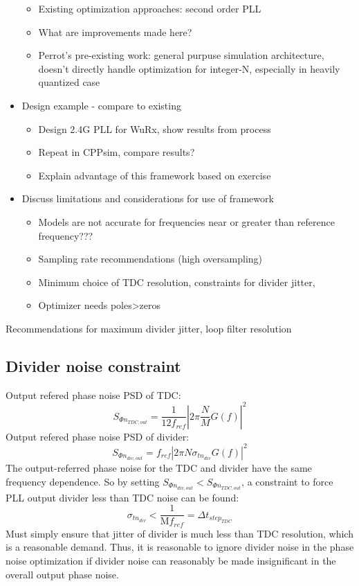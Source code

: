 \begin{itemize}
\begin{itemize}
		\item Existing optimization approaches: second order PLL \cite{spalvieri_2006}
		\item What are improvements made here?
		\item Perrot's pre-existing work: general purpuse simulation architecture, doesn't directly handle optimization for integer-N, especially in heavily quantized case
	\end{itemize}
	\item Design example - compare to existing
	\begin{itemize}
		\item Design 2.4G PLL for WuRx, show results from process
		\item Repeat in CPPsim, compare results?
		\item Explain advantage of this framework based on exercise
	\end{itemize}
	\item Discuss limitations and considerations for use of framework
	\begin{itemize}
		\item Models are not accurate for frequencies near or greater than reference frequency???
		\item Sampling rate recommendations (high oversampling)
		\item Minimum choice of TDC resolution, constraints for divider jitter,
		\item Optimizer needs poles>zeros
	\end{itemize}
\end{itemize}

	Recommendations for maximum divider jitter, loop filter resolution
	\subsection{Divider noise constraint}
		Output refered phase noise PSD of TDC:
		\begin{equation}
			S_{\Phi n_{TDC,out}} = \frac{1}{12 f_{ref}}\left|2\pi\frac{N}{M} G(f) \right|^2
		\end{equation}
		Output refered phase noise PSD of divider:
		\begin{equation}
			S_{\Phi n_{div, out}} = f_{ref} \left|2\pi N \sigma_{tn_{div}} G(f)\right|^2
		\end{equation}
		The output-referred phase noise for the TDC and divider have the same frequency dependence. So by setting $S_{\Phi n_{div, out}} < S_{\Phi n_{TDC,out}}$, a constraint to force PLL output divider less than TDC noise can be found:
		\begin{equation}
			\sigma_{tn_{div}} < \frac{1}{\mathrm{M}f_{ref}} = \Delta t_{step_{TDC}}
		\end{equation}
		Must simply ensure that jitter of divider is much less than TDC resolution, which is a reasonable demand. Thus, it is reasonable to ignore divider noise in the phase noise optimization if divider noise can reasonably be made insignificant in the overall output phase noise.


